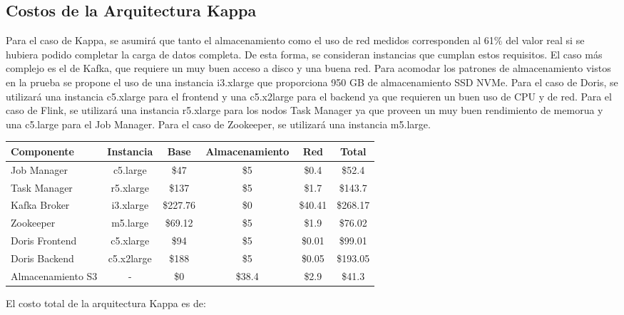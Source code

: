 \newpage
\subsection{Costos de la Arquitectura Kappa}

Para el caso de Kappa, se asumirá que tanto el almacenamiento como el uso de red medidos corresponden al 61\% del valor real si se hubiera podido completar la carga de datos completa.
De esta forma, se consideran instancias que cumplan estos requisitos. 
El caso más complejo es el de Kafka, que requiere un muy buen acceso a disco y una buena red. 
Para acomodar los patrones de almacenamiento vistos en la prueba se propone el uso de una instancia i3.xlarge que proporciona 950 GB de almacenamiento SSD NVMe.
Para el caso de Doris, se utilizará una instancia c5.xlarge para el frontend y una c5.x2large para el backend ya que requieren un buen uso de CPU y de red.
Para el caso de Flink, se utilizará una instancia r5.xlarge para los nodos Task Manager  ya que proveen un muy buen rendimiento de memorua y una c5.large para el Job Manager.
Para el caso de Zookeeper, se utilizará una instancia m5.large.  

\begin{longtable}{|p{3cm}|c|c|c|c|c|}
    \hline
    \textbf{Componente} & \textbf{Instancia} & \textbf{Base} & \textbf{Almacenamiento} & \textbf{Red} & \textbf{Total} \\
    \hline
    Job Manager & c5.large & \$47 & \$5 & \$0.4 & \$52.4 \\
    \hline
    Task Manager & r5.xlarge & \$137 & \$5 & \$1.7 & \$143.7 \\
    \hline
    Kafka Broker & i3.xlarge & \$227.76 & \$0 & \$40.41 & \$268.17 \\
    \hline
    Zookeeper & m5.large & \$69.12 & \$5 & \$1.9 & \$76.02 \\
    \hline
    Doris Frontend & c5.xlarge & \$94 & \$5 & \$0.01 & \$99.01 \\
    \hline
    Doris Backend & c5.x2large & \$188 & \$5 & \$0.05 & \$193.05 \\
    \hline
    Almacenamiento S3 & - & \$0 & \$38.4 & \$2.9 & \$41.3 \\
    \hline
\end{longtable}

El costo total de la arquitectura Kappa es de: 
\newline
\newline
{}
\newpage


